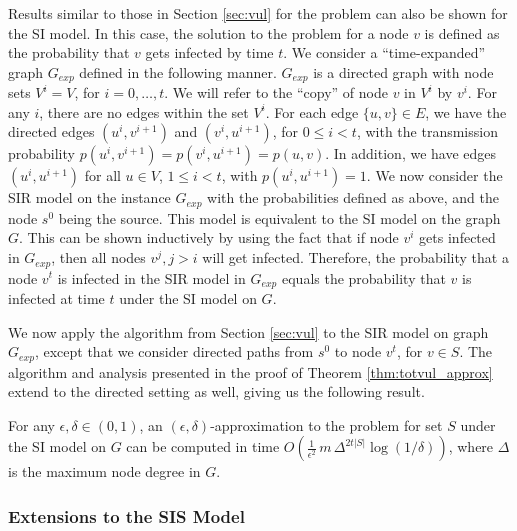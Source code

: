 Results similar to those in Section \ref{sec:vul} for the \tTotVuls{}
problem can also be shown for the SI model. 
In this case, the
solution to the \tTotVuls{} problem for a node $v$ is defined as the
probability that $v$ gets infected by time $t$.  
We consider a ``time-expanded'' graph $G_{exp}$ defined in the following manner.
$G_{exp}$ is a directed graph with node sets 
$V^i=V$, for $i=0,\ldots, t$. 
We will refer to the ``copy'' of node $v$ in $V^i$ by $v^i$.
For any $i$, there are no edges within the set $V^i$.  
For each edge $\{u, v\}\in E$, we have the directed edges 
$(u^i, v^{i+1})$ and $(v^i, u^{i+1})$, for $0 \leq i <t$,
with the transmission probability 
$p(u^i, v^{i+1}) = p(v^i, u^{i+1}) = p(u,v)$.  
In addition, we have edges $(u^i, u^{i+1})$ for all
$u\in V$, $1 \leq i < t$, with $p(u^i, u^{i+1})=1$.  
We now consider the SIR
model on the instance $G_{exp}$ with the probabilities defined as
above, and the node $s^0$ being the source. 
This model is equivalent to the SI model on the graph $G$. 
This can be shown inductively by
using the fact that if node $v^i$ gets infected in $G_{exp}$, then
all nodes $v^j, j>i$ will get infected.  
Therefore, the probability
that a node $v^t$ is infected in the SIR model in $G_{exp}$ equals
the probability that $v$ is infected at time $t$ under the SI model
on $G$.

We now apply the algorithm from Section \ref{sec:vul} to the SIR
model on graph $G_{exp}$, except that we consider directed paths
from $s^0$ to node $v^t$, for $v\in S$. 
The algorithm and
analysis presented in the proof of 
Theorem \ref{thm:totvul_approx} extend to the directed
setting as well, giving us the following result.

\begin{proposition}\label{pro:si_model_ttotvul}
For any $\epsilon, \delta\in(0,1)$, an
$(\epsilon, \delta)$-approximation to the \tTotVuls{} problem 
for set $S$ under the SI model on $G$
can be computed in time 
$O(\frac{1}{\epsilon^2}\,m\,\Delta^{2t|S|}\log{(1/\delta)})$,
where $\Delta$ is the maximum node degree in $G$. \QED 
\end{proposition}

\subsubsection{Extensions to the SIS Model}
\label{sss:sis_extensions}

